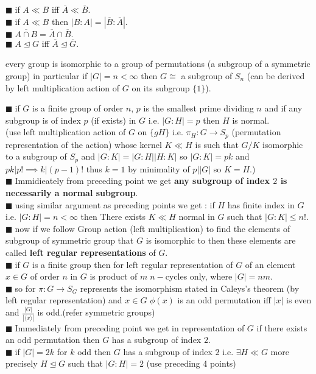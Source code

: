 \documentclass[11pt]{extarticle}
\newcommand{\ra}{\rightarrow}
\newcommand{\snote}[1]{{\footnotesize(#1)}}
\newcommand{\y}{$\blacksquare\;$}
\newcommand{\gen}[1]{\langle #1 \rangle}
\newcommand{\tbx}[2][]{
	\begin{tcolorbox}[enhanced,breakable,size=small,colback=black!2!white,title={#1},arc is angular, arc=1.5mm,drop fuzzy shadow]
		#2
	\end{tcolorbox}
}
\begin{document}
\begin{multicols}{2}
{			\y  if $ A\ll B $ iff $ \overline{A} \ll \overline{B} $. \\
			\y  if $ A\ll B $ then $ |B:A|=|\overline{B}:\overline{A}| .$ \\
			\y  $ \overline{A\cap B}= \overline{A}\cap \overline{B}. $  \\
			\y  $ A\trianglelefteq G $ iff $ \overline{A} \trianglelefteq \overline{G}. $ 
		
	}
	\tbx[\textbf{ Cayley's Theorem} ]{every group is isomorphic to a group of permutations (a subgroup
		of a symmetric group)  in particular if $ |G|=n<\infty $  then $ G\cong $ a subgroup of $ S_n $
		\snote{can be derived by left multiplication action of $ G $ on its subgroup $ \{1\} $}.
	}
	\tbx[Consequences of Cayley's theorem]{ 
			\y    if   $ G $ is a finite group of order $ n $, $ p $ is the smallest prime dividing $ n $ and if any subgroup is of 	index $ p $ (if exists) in $ G $ i.e. $ |G:H|=p $ then $ H $ is normal. \\
			\snote{use  left multiplication action of $ G $ on $ \{gH\} $ i.e. $ \pi_H : G\ra S_p $ (permutation representation of the action) whose kernel $ K\ll H $ is such that $ G/K $ isomorphic to a subgroup of $ S_p $ and $|G:K|=|G:H||H:K|  $ so $ |G:K|=pk $ and $ pk|p!\implies k|(p-1)! $ thus $ k=1 $ by minimality of $ p||G| $ so $ K=H $.}\\
			\y Immidieately from preceding point we get \textbf{any subgroup of index $ 2 $ is necessarily a normal subgroup}. \\
			\y  using similar argument as preceding points we get : if $ H $ has finite index in $ G $ i.e. $ |G:H|=n<\infty $ then  
			There exists $ K\ll H $ normal in $ G $ such that $ |G:K|\leq n! .$\\
			\y now if we follow Group action (left multiplication) to find the elements of subgroup of symmetric group that $ G $ is isomorphic to then these elements are called \textbf{left regular representations} of $ G $. \\
			\y  if $ G $ is a finite group then for left regular representation of $ G $ of an element $ x\in G $ of order $ n $ in $ G $ is product of $ m \; n- $cycles only, where $ |G|=nm .$  \\
			\y so for $ \pi:G\ra S_G$ represents the isomorphism stated in Caleys's theorem (by left regular representation)  and  $ x\in G $ $ \phi(x) $ is an odd permutation iff $ |x| $ is even and $ \frac{ |G| }{|\gen{x}|}  $ is odd.\snote{refer symmetric groups}\\
			\y Immediately  from preceding point we get in representation of $ G $ if there exists an odd permutation then $ G $ has a subgroup of index $ 2.$ \\
			\y  if $|G|=2k $ for $ k $ odd then $ G $ has a subgroup of index $ 2 $ i.e. $ \exists H\ll G $ more precisely $ H\trianglelefteq G $ such that $ |G:H|=2 $ ({\footnotesize use preceding 4 points)} 
	}
	

\end{multicols}
\end{document}
